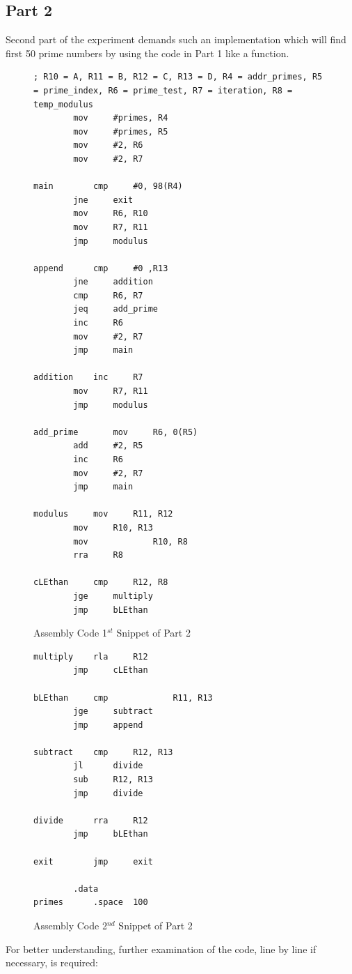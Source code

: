 \documentclass[pdftex,12pt,a4paper]{article}
\begin{document}
\subsection{Part 2}
Second part of the experiment demands such an implementation which will find first 50 prime numbers by using the code in Part 1 like a function.
\begin{figure}[H]
    \centering
    \begin{lstlisting}[language={[x86masm]Assembler}]
; R10 = A, R11 = B, R12 = C, R13 = D, R4 = addr_primes, R5 = prime_index, R6 = prime_test, R7 = iteration, R8 = temp_modulus    
		mov		#primes, R4
		mov		#primes, R5
		mov		#2, R6
		mov		#2, R7

main		cmp		#0, 98(R4)
		jne		exit
		mov		R6, R10
		mov		R7, R11
		jmp		modulus

append		cmp		#0 ,R13
		jne		addition
		cmp		R6, R7
		jeq		add_prime
		inc		R6
		mov		#2, R7
		jmp		main

addition	inc		R7
		mov		R7,	R11
		jmp		modulus

add_prime       mov		R6, 0(R5)
		add		#2, R5
		inc		R6
		mov		#2, R7
		jmp		main

modulus		mov		R11, R12
		mov		R10, R13
		mov             R10, R8
		rra		R8

cLEthan		cmp		R12, R8
		jge		multiply
		jmp		bLEthan\end{lstlisting}
    \label{code:part2_1}
    \caption{Assembly Code 1$^{st}$ Snippet of Part 2}
\end{figure}
\begin{figure}[H]
    \centering
    \begin{lstlisting}[language={[x86masm]Assembler}, firstnumber=39]
multiply	rla		R12
		jmp		cLEthan

bLEthan		cmp 	        R11, R13
		jge		subtract
		jmp		append

subtract	cmp		R12, R13
		jl		divide
		sub		R12, R13
		jmp		divide

divide		rra		R12
		jmp		bLEthan

exit		jmp		exit

		.data
primes		.space	100
    \end{lstlisting}
    \label{code:part2_2}
    \caption{Assembly Code 2$^{nd}$ Snippet of Part 2}
\end{figure}

For better understanding, further examination of the code, line by line if necessary, is required:
\end{document}
